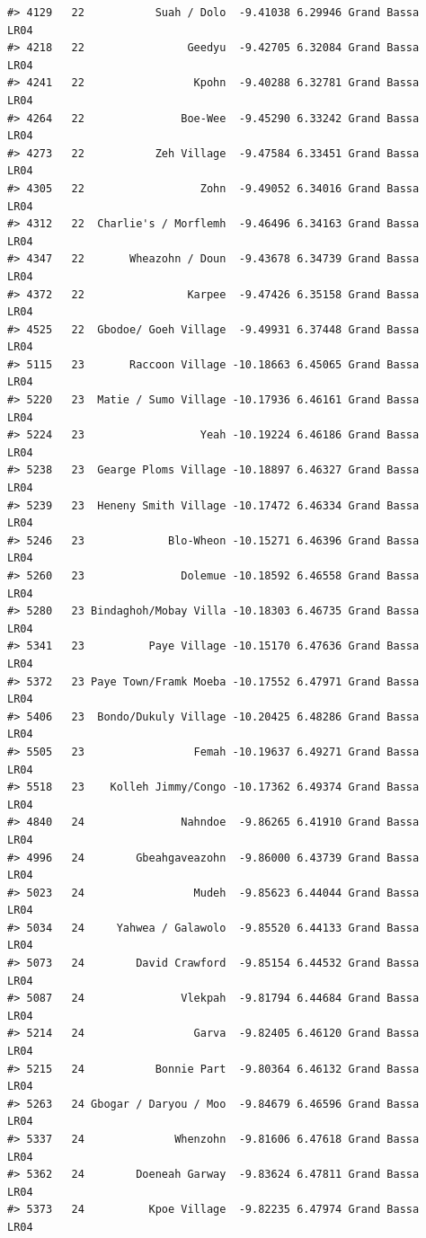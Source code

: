 \documentclass[12pt,a4paper]{book}
\theoremstyle{definition}
\theoremstyle{definition}
\theoremstyle{definition}
\theoremstyle{remark}
\begin{document}
\begin{verbatim}
#> 4129   22           Suah / Dolo  -9.41038 6.29946 Grand Bassa       LR04
#> 4218   22                Geedyu  -9.42705 6.32084 Grand Bassa       LR04
#> 4241   22                 Kpohn  -9.40288 6.32781 Grand Bassa       LR04
#> 4264   22               Boe-Wee  -9.45290 6.33242 Grand Bassa       LR04
#> 4273   22           Zeh Village  -9.47584 6.33451 Grand Bassa       LR04
#> 4305   22                  Zohn  -9.49052 6.34016 Grand Bassa       LR04
#> 4312   22  Charlie's / Morflemh  -9.46496 6.34163 Grand Bassa       LR04
#> 4347   22       Wheazohn / Doun  -9.43678 6.34739 Grand Bassa       LR04
#> 4372   22                Karpee  -9.47426 6.35158 Grand Bassa       LR04
#> 4525   22  Gbodoe/ Goeh Village  -9.49931 6.37448 Grand Bassa       LR04
#> 5115   23       Raccoon Village -10.18663 6.45065 Grand Bassa       LR04
#> 5220   23  Matie / Sumo Village -10.17936 6.46161 Grand Bassa       LR04
#> 5224   23                  Yeah -10.19224 6.46186 Grand Bassa       LR04
#> 5238   23  Gearge Ploms Village -10.18897 6.46327 Grand Bassa       LR04
#> 5239   23  Heneny Smith Village -10.17472 6.46334 Grand Bassa       LR04
#> 5246   23             Blo-Wheon -10.15271 6.46396 Grand Bassa       LR04
#> 5260   23               Dolemue -10.18592 6.46558 Grand Bassa       LR04
#> 5280   23 Bindaghoh/Mobay Villa -10.18303 6.46735 Grand Bassa       LR04
#> 5341   23          Paye Village -10.15170 6.47636 Grand Bassa       LR04
#> 5372   23 Paye Town/Framk Moeba -10.17552 6.47971 Grand Bassa       LR04
#> 5406   23  Bondo/Dukuly Village -10.20425 6.48286 Grand Bassa       LR04
#> 5505   23                 Femah -10.19637 6.49271 Grand Bassa       LR04
#> 5518   23    Kolleh Jimmy/Congo -10.17362 6.49374 Grand Bassa       LR04
#> 4840   24               Nahndoe  -9.86265 6.41910 Grand Bassa       LR04
#> 4996   24        Gbeahgaveazohn  -9.86000 6.43739 Grand Bassa       LR04
#> 5023   24                 Mudeh  -9.85623 6.44044 Grand Bassa       LR04
#> 5034   24     Yahwea / Galawolo  -9.85520 6.44133 Grand Bassa       LR04
#> 5073   24        David Crawford  -9.85154 6.44532 Grand Bassa       LR04
#> 5087   24               Vlekpah  -9.81794 6.44684 Grand Bassa       LR04
#> 5214   24                 Garva  -9.82405 6.46120 Grand Bassa       LR04
#> 5215   24           Bonnie Part  -9.80364 6.46132 Grand Bassa       LR04
#> 5263   24 Gbogar / Daryou / Moo  -9.84679 6.46596 Grand Bassa       LR04
#> 5337   24              Whenzohn  -9.81606 6.47618 Grand Bassa       LR04
#> 5362   24        Doeneah Garway  -9.83624 6.47811 Grand Bassa       LR04
#> 5373   24          Kpoe Village  -9.82235 6.47974 Grand Bassa       LR04

\end{verbatim}
\end{document}
